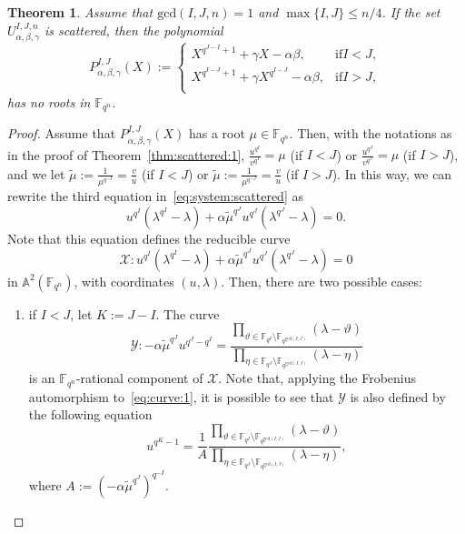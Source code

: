 \documentclass[11pt]{article}
\newtheorem{theorem}[theo]{Theorem}
\theoremstyle{definition}
\numberwithin{equation}{section}
\begin{document}
\begin{theorem}
\label{thm:scattered:2}
Assume that $\mathrm{gcd}(I,J,n)=1$ and $\max\{I,J\}\leq n/4$.
If the set $U_{\alpha, \beta, \gamma}^{I,J,n}$ is scattered, then 
the polynomial 
\begin{equation}
    P^{I,J}_{\alpha,\beta,\gamma}(X):=\begin{cases}
    X^{q^{J-I}+1} + \gamma X - \alpha\beta,& \mathrm{if } I<J,\\ 
     X^{q^{I-J}+1} + \gamma X^{q^{I-J}} - \alpha\beta,& \mathrm{if } I>J,\\
    \end{cases}
\end{equation}
has no roots in $\mathbb{F}_{q^n}$.
\end{theorem}


\begin{proof}
Assume that $P^{I,J}_{\alpha,\beta,\gamma}(X)$ has a root $\mu \in \mathbb{F}_{q^n}$. Then, with the notations as in the proof of Theorem~\ref{thm:scattered:1}, $\frac{u^{q^I}}{v^{q^I}}=\mu$ (if $I < J$) or $\frac{u^{q^J}}{v^{q^J}}=\mu$ (if $I > J$), and we let $\tilde{\mu}:=\frac{1}{\mu^{q^{-I}}}=\frac{v}{u}$ (if $I < J$) or $\tilde{\mu}:=\frac{1}{\mu^{q^{-J}}}=\frac{v}{u}$ (if $I > J$). In this way, we can rewrite the third equation in~\eqref{eq:system:scattered} as
\begin{equation*}
    u^{q^I}\left(\lambda^{q^I}-\lambda\right) + \alpha\tilde{\mu}^{q^J}u^{q^J}\left(\lambda^{q^J}-\lambda\right) = 0.
\end{equation*}
Note that this equation defines the reducible curve 
\begin{equation*}
    \mathcal{X}: u^{q^I}\left(\lambda^{q^I}-\lambda\right) + \alpha\tilde{\mu}^{q^J}u^{q^J}\left(\lambda^{q^J}-\lambda\right) = 0
\end{equation*}
in $\mathbb{A}^2(\mathbb{F}_{q^n})$, with coordinates $(u,\lambda)$. Then, there are two possible cases:

\begin{enumerate}
    \item if $I < J$, let $K:=J - I$. The curve
\begin{equation}
\label{eq:curve:1}
    \mathcal{Y}: -\alpha \tilde{\mu}^{q^J}u^{q^J-q^I} = \frac{\prod_{\vartheta\in \mathbb{F}_{q^I}\setminus \mathbb{F}_{q^{\mathrm{gcd}(I,J)}}}\left(\lambda - \vartheta\right)}{\prod_{\eta\in \mathbb{F}_{q^J}\setminus \mathbb{F}_{q^{\mathrm{gcd}(I,J)}}}\left(\lambda - \eta\right)} 
\end{equation}
is an $\mathbb{F}_{q^n}$-rational component of $\mathcal{X}$.
Note that, applying the Frobenius automorphism to~\eqref{eq:curve:1}, it is possible to see that $\mathcal{Y}$ is also defined by the following equation
\begin{equation}
    \label{eq:curve:frobenius:1}
    u^{q^K-1} = \frac{1}{A} \frac{\prod_{\vartheta\in \mathbb{F}_{q^I}\setminus \mathbb{F}_{q^{\mathrm{gcd}(I,J)}}}\left(\lambda - \vartheta\right)}{\prod_{\eta\in \mathbb{F}_{q^J}\setminus \mathbb{F}_{q^{\mathrm{gcd}(I,J)}}}\left(\lambda - \eta\right)}, 
\end{equation}
where $A:=\left(-\alpha\tilde{\mu}^{q^J}\right)^{q^{-I}}$.


\end{enumerate}
\end{proof}
\end{document}
